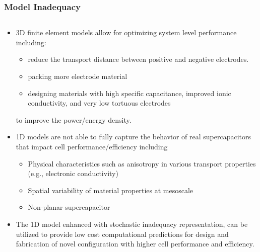 \documentclass[8pt]{beamer}
\begin{document}
\begin{frame}
\frametitle{Model Inadequacy}
\vfill

\begin{columns}
\begin{column}{.55\textwidth}
\begin{block}{}
\begin{itemize}

\item 3D finite element models allow for optimizing system level performance including:
\begin{itemize}
\item reduce the transport distance between positive and negative electrodes.
\item packing more electrode material
\item designing materials with high specific capacitance, improved ionic conductivity, and very low tortuous electrodes
\end{itemize} 
to improve the power/energy density. 

\item 1D models are not able to fully capture the behavior of real supercapacitors that impact cell performance/efficiency including
\begin{itemize}
\item Physical characteristics such as anisotropy in various transport properties (e.g., electronic conductivity)
\item Spatial variability of material properties at mesoscale
\item Non-planar supercapacitor 
\end{itemize}

\item The 1D model enhanced with stochastic inadequacy representation, can be utilized to provide low cost computational predictions for design and fabrication of novel configuration with higher cell performance and efficiency.

\end{itemize}


\end{block}
\end{column}
\end{columns}
\end{frame}
\end{document}
